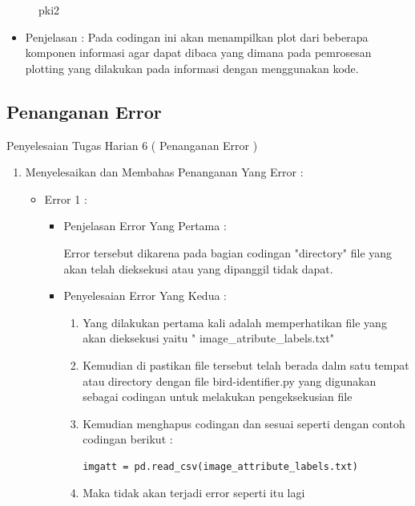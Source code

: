 \begin{enumerate}
\begin{itemize}
\begin{figure}[ht]
\caption{pki2}
\label{contoh}
\end{figure}
\par
\begin{itemize}
\item Penjelasan : Pada codingan ini akan menampilkan plot dari beberapa komponen informasi agar dapat dibaca yang dimana pada pemrosesan plotting yang dilakukan pada informasi dengan menggunakan kode.
\par
\par
\end{itemize}
\end{itemize}


\par
\par
\subsection{Penanganan Error}
Penyelesaian Tugas Harian 6 ( Penanganan Error )
\begin{enumerate}
\item Menyelesaikan dan Membahas Penanganan Yang Error :
\begin{itemize}
\item Error 1 :
\par 
\par
\begin{itemize}
\item Penjelasan Error Yang Pertama :
\par Error tersebut dikarena pada bagian codingan "directory" file yang akan telah dieksekusi atau yang dipanggil tidak dapat.
\item Penyelesaian Error Yang Kedua :
\begin{enumerate}
\item Yang dilakukan pertama kali adalah memperhatikan file yang akan dieksekusi yaitu " image\_atribute\_labels.txt" 
\item Kemudian di pastikan file tersebut telah berada dalm satu tempat atau directory dengan file bird-identifier.py yang digunakan sebagai codingan untuk melakukan pengeksekusian file
\item Kemudian menghapus codingan dan sesuai seperti dengan contoh codingan berikut :
\begin{lstlisting}
imgatt = pd.read_csv(image_attribute_labels.txt)
\end{lstlisting}
\par
\item Maka tidak akan terjadi error seperti itu lagi

\end{enumerate}
\end{itemize}
\end{itemize}
\end{enumerate}
\end{enumerate}
